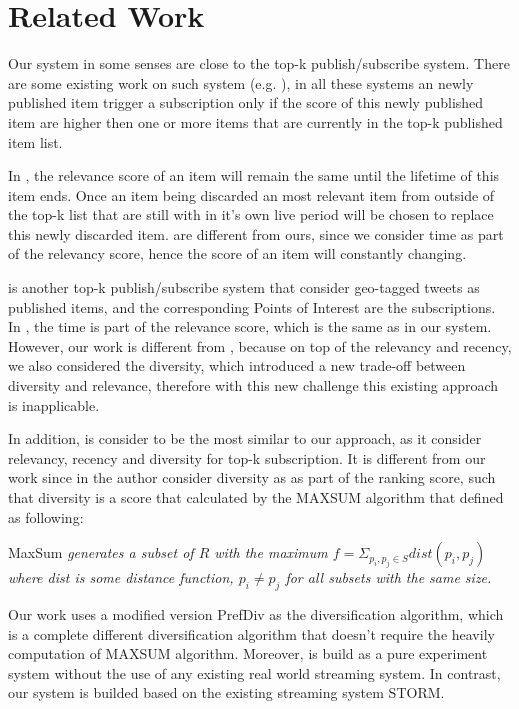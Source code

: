 \section{Related Work}

Our system in some senses are close to the top-k publish/subscribe system.  There are some existing work on such system (e.g. \cite{Cong:2009,Haghani:2009,Haghani:2010,Aberer:2008}), in all these systems an newly published item trigger a  subscription only if the score of this newly published item are higher then one or more items that are currently in the top-k published item list.  

In \cite{Haghani:2009,Haghani:2010,Aberer:2008}, the relevance score of an item will remain the same until the lifetime of this item ends. Once an item being discarded an most relevant item from outside of the top-k list that are still with in it's own live period will be chosen to replace this newly discarded item. \cite{Haghani:2009,Haghani:2010,Aberer:2008} are different from ours, since we consider time as part of the relevancy score, hence the score of an item will constantly changing. 

\cite{Cong:2009} is another top-k publish/subscribe system that consider geo-tagged tweets as published items, and the corresponding Points of Interest are the subscriptions. In \cite{Cong:2009} , the time is part of the relevance score, which is the same as in our system. However, our work is different from \cite{Cong:2009} , because on top of the relevancy and recency, we also considered the diversity, which introduced a new trade-off between diversity and relevance, therefore with this new challenge this existing approach is inapplicable. 

In addition, \cite{Chen:2015} is consider to be the most similar to our approach, as it consider relevancy, recency and diversity for top-k subscription. It is different from our work since in \cite{Chen:2015} the author consider diversity as as part of the ranking score, such that diversity is a score that calculated by the MAXSUM algorithm that defined as following:

\begin{mydef} \label{def1}
 MaxSum \emph{generates a subset of $R$ with the maximum $f = \Sigma_{p_i,p_j \in S} dist(p_i, p_j )$ where \emph{dist} is some distance function, $p_i \neq p_j$ for all subsets with the same size.}
\end{mydef}

Our work uses a modified version PrefDiv as the diversification algorithm, which is a complete different diversification algorithm that doesn't require the heavily computation of MAXSUM algorithm. Moreover, \cite{Chen:2015} is build as a pure experiment system without the use of any existing real world streaming system. In contrast, our system is builded based on the existing streaming system STORM.
